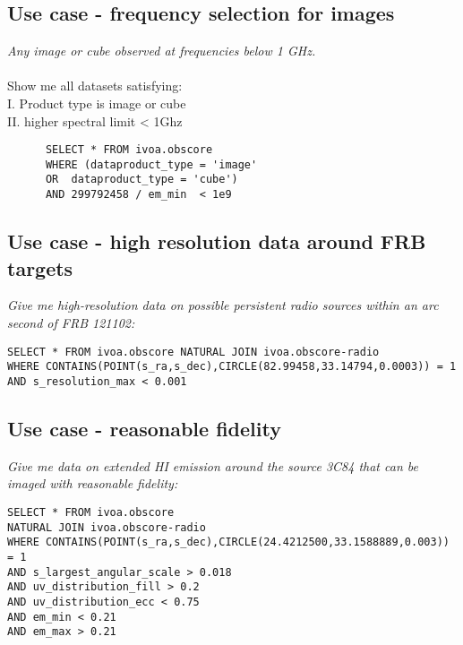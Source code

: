\subsection{Use case - frequency selection  for images }
\textit{Any image or cube observed at frequencies below 1 GHz.}\\ \\
Show me all datasets satisfying:\\
I. Product type is image or cube \\
II. higher spectral limit < 1Ghz
\begin{verbatim}
      SELECT * FROM ivoa.obscore
      WHERE (dataproduct_type = 'image' 
      OR  dataproduct_type = 'cube') 
      AND 299792458 / em_min  < 1e9
\end{verbatim}


 


\subsection{Use case - high resolution data around FRB targets }

\textit{Give me high-resolution data on possible persistent radio sources within an arc second of FRB 121102:}

\begin{verbatim}
SELECT * FROM ivoa.obscore NATURAL JOIN ivoa.obscore-radio
WHERE CONTAINS(POINT(s_ra,s_dec),CIRCLE(82.99458,33.14794,0.0003)) = 1 
AND s_resolution_max < 0.001
\end{verbatim}

\subsection{Use case - reasonable fidelity}

\textit{Give me data on extended HI emission around the source 3C84 that can
be imaged with reasonable fidelity:}

\begin{verbatim}
SELECT * FROM ivoa.obscore 
NATURAL JOIN ivoa.obscore-radio
WHERE CONTAINS(POINT(s_ra,s_dec),CIRCLE(24.4212500,33.1588889,0.003)) = 1 
AND s_largest_angular_scale > 0.018 
AND uv_distribution_fill > 0.2 
AND uv_distribution_ecc < 0.75 
AND em_min < 0.21 
AND em_max > 0.21
\end{verbatim}

